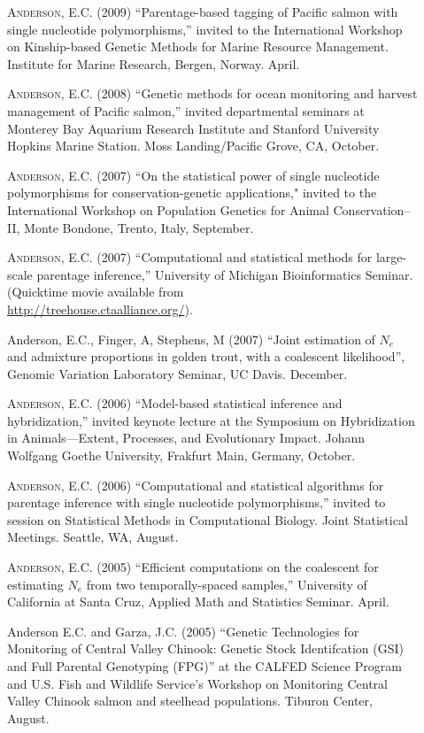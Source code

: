 \documentclass[11pt]{article}
\begin{document}
\begin{description}
\item[] \textsc{Anderson, E.C.} (2009)  ``Parentage-based tagging of Pacific salmon with single nucleotide polymorphisms,'' invited to the International Workshop on Kinship-based Genetic Methods for Marine Resource Management. Institute for Marine Research, Bergen, Norway. April.
\item[] \textsc{Anderson, E.C.} (2008) ``Genetic methods for ocean monitoring and  harvest management of Pacific salmon,'' invited departmental seminars at Monterey Bay Aquarium Research Institute and Stanford University Hopkins Marine Station.  Moss Landing/Pacific Grove, CA, October.
\item[] \textsc{Anderson, E.C.} (2007) ``On the statistical power of  single nucleotide polymorphisms for conservation-genetic applications," invited to the International Workshop on
Population Genetics for Animal Conservation--II, Monte Bondone, Trento, Italy, September.
\item[] \textsc{Anderson, E.C.} (2007) ``Computational and statistical methods for large-scale parentage inference,'' University of Michigan Bioinformatics Seminar.  (Quicktime movie available from \\
\href{http://treehouse.ctaalliance.org/}{http://treehouse.ctaalliance.org/}).
\item[] {\sc Anderson, E.C.}, Finger, A, Stephens, M (2007) ``Joint estimation of $N_e$ and admixture proportions in golden trout, with a coalescent likelihood'', Genomic Variation Laboratory Seminar, UC Davis. December.
\item[] \textsc{Anderson, E.C.} (2006) ``Model-based statistical inference and hybridization,'' invited keynote lecture at the Symposium on Hybridization in Animals---Extent, Processes, and Evolutionary Impact.  Johann Wolfgang Goethe University, Frakfurt Main, Germany, October.
\item[] \textsc{Anderson, E.C.} (2006) ``Computational and statistical algorithms for parentage inference with single nucleotide polymorphisms,'' invited to session on Statistical Methods in Computational Biology.  Joint Statistical Meetings. Seattle, WA, August.
\item[] \textsc{Anderson, E.C.} (2005) ``Efficient computations on the coalescent for estimating $N_e$ from two temporally-spaced samples,'' University of California at Santa Cruz, Applied Math and Statistics Seminar. April.
\item[] {\sc Anderson E.C.} and Garza, J.C. (2005) ``Genetic Technologies for Monitoring of Central Valley Chinook: Genetic Stock Identifcation (GSI) and Full Parental Genotyping (FPG)'' at the CALFED Science Program and U.S. Fish and Wildlife Service's Workshop on Monitoring Central Valley Chinook salmon and steelhead populations. Tiburon Center, August.

\end{description}
\end{document}
